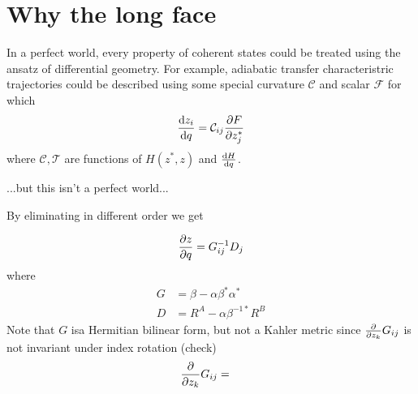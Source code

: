 \documentclass[12pt]{article}
\begin{document}
	\section{Why the long face}
	In a perfect world, every property of coherent states could be treated using the ansatz of differential geometry. For example, adiabatic transfer characteristric trajectories could be described using some special curvature $\mathcal{C}$ and scalar $\mathcal{F}$ for which
	\begin{equation}
	\dv{z_i}{q} = \mathcal{C}_{ij} \pdv{F}{z_j^*}
	\end{equation}
	where $\mathcal{C}, \mathcal{T}$ are functions of $H(z^*, z)$ and $\dv{H}{q}$.
	
	...but this isn't a perfect world...
	
	By eliminating in different order we get
	
	\begin{equation}
	\pdv{z}{q} = G_{ij}^{-1} D_j
	\end{equation}
	where
	\begin{align}
	G &= \beta - \alpha \beta^* \alpha^{*}\\
	D &= R^A - \alpha \beta^{-1*} R^B
	\end{align}
	Note that $G$ isa Hermitian bilinear form, but not a Kahler metric since $\pdv{z_k}G_{ij}$ is not invariant under index rotation (check)
	\begin{align}
	\pdv{z_k}G_{ij} &= 
	\end{align}
	
	
	
	
\end{document}
